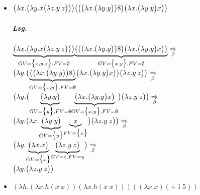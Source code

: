\documentclass{scrreprt}
\begin{document}
\begin{enumerate}[(a)]
\begin{itemize}
  \newpage
  \item $\qty\big(\lambda x.\qty\big(\lambda y.x \qty\big(\lambda z.y \: z)))
    \qty\big(
      \qty\big(\qty\big(\lambda x. \qty\big(\lambda y.y)) 8)
      \qty\big(\lambda x.\qty\big(\lambda y.y) x)
    )$
    
    \subparagraph{Lsg.}
    $\underset{GV = \qty\big{x, y, z}, FV = \emptyset}{\underbrace{
      \qty\big(\lambda x.\qty\big(\lambda y.x \qty\big(\lambda z.y \: z)))
    }}
    \underset{GV = \qty\big{x, y}, FV = \emptyset}{\underbrace{
      \qty\big(
        \qty\big(\qty\big(\lambda x. \qty\big(\lambda y.y)) 8)
        \qty\big(\lambda x.\qty\big(\lambda y.y) x)
      )
    }} \underset{\beta}\Rightarrow$ \\
    $\qty\big(\lambda y.\qty\big(
        \underset{GV = \qty\big{x, y}, FV = \emptyset}{\underbrace{
          \qty\big(\qty\big(\lambda x. \qty\big(\lambda y.y)) 8)
        }}
        \qty\big(\lambda x.\qty\big(\lambda y.y) x)
    ) \qty\big(\lambda z.y \: z))  \underset{\beta}\Rightarrow$ \\
    $\qty\big(\lambda y.\qty\big(
      \underset{GV = \qty\big{y}, FV = \emptyset}{
        \underbrace{\qty\big(\lambda y.y)
      }}
      \underset{GV = \qty\big{x, y}, FV = \emptyset}{\underbrace{
        \qty\big(\lambda x.\qty\big(\lambda y.y) x)
      }}
    ) \qty\big(\lambda z.y \: z))  \underset{\beta}\Rightarrow$ \\
    $\qty\big(\lambda y.\qty\big(
      \lambda x.\underset{GV = \qty\big{y}}{\underbrace{\qty\big(\lambda y.y)}}
      \underset{FV=\qty\big{x}}{\underbrace{x}}
    ) \qty\big(\lambda z.y \: z))  \underset{\beta}\Rightarrow$ \\
    $\qty\big(\lambda y.\underset{GV = \qty\big{x}}{\underbrace{\qty\big(
      \lambda x.x
    )}} \underset{GV={z},FV={y}}{\underbrace{\qty\big(\lambda z.y \: z)}})  \underset{\beta}\Rightarrow$ \\
    $\qty\big(\lambda y.\qty\big(\lambda z.y \: z))$

  \item $(\lambda h.(\lambda x.h (x \: x)) (\lambda x.h (x \: x)))
    ((\lambda x.x) (+ \: 1 \: 5))$


\end{itemize}
\end{enumerate}
\end{document}
